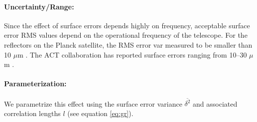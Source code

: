 \paragraph{Uncertainty/Range:}
Since the effect of surface errors depends highly on frequency, acceptable surface error RMS values depend on the operational frequency of the telescope. For the reflectors on the Planck satellite, the RMS error var measured to be smaller than 10 $\mu$m \cite{Tauber2010}. The ACT collaboration has reported surface errors ranging from 10--30 $\mu$m \cite{Hincks2008}.

\paragraph{Parameterization:}
We parametrize this effect using the surface error variance $\overline{\delta^2}$ and associated correlation lengths $l$ (see equation \ref{eq:gr}). 
